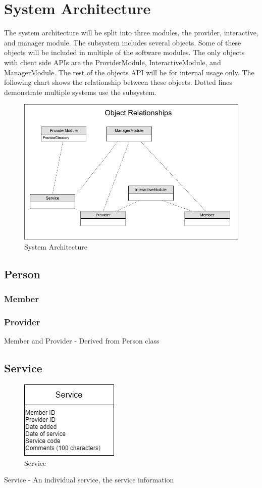 \documentclass{article}
\begin{document}
\section{System Architecture}
The system architecture will be split into three modules, the provider, interactive, and manager module. The subsystem includes several objects. Some of these objects will be included in multiple of the software modules. The only objects with client side APIs are the ProviderModule, InteractiveModule, and ManagerModule. The rest of the objects API will be for internal usage only. The following chart shows the relationship between these objects. Dotted lines demonstrate multiple systems use the subsystem.

  \begin{figure}[h!]
	\centering
	\includegraphics[width=0.8\linewidth]{architecture.png}
	\caption[System Architecture]{System Architecture}
	\label{fig:P1compileP0-1}
  \end{figure}

\subsection{Person}
\subsubsection{Member}
\subsubsection{Provider}
Member and Provider - Derived from Person class

\subsection{Service}
  \begin{figure}[h!]
	\centering
	\includegraphics[width=0.3\linewidth]{service.png}
	\caption[Service]{Service}
	\label{fig:P1compileP0-1}
  \end{figure}
Service - An individual service, the service information
\end{document}
